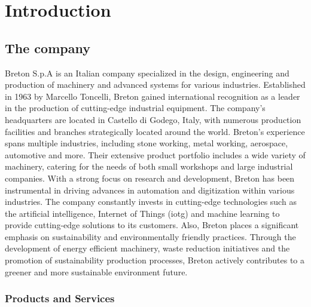 \chapter{Introduction}\label{cap:Introduction}
\section{The company}
Breton S.p.A is an Italian company specialized in the design, engineering and production of machinery and advanced systems for various industries. 
Established in 1963 by Marcello Toncelli, Breton gained international recognition as a leader in the production of cutting-edge industrial equipment. 
The company's headquarters are located in Castello di Godego, Italy, with numerous production facilities and branches strategically located around the world. 
Breton's experience spans multiple industries, including stone working, metal working, aerospace, automotive and more.
Their extensive product portfolio includes a wide variety of machinery, catering for the needs of both small workshops and large industrial companies.
With a strong focus on research and development, Breton has been instrumental in driving advances in automation and digitization within various industries.
The company constantly invests in cutting-edge technologies such as the artificial intelligence, Internet of Things (\gls{iotg}\glsfirstoccur) and machine learning to provide cutting-edge solutions to its customers. 
Also, Breton places a significant emphasis on sustainability and environmentally friendly practices. 
Through the development of energy efficient machinery, waste reduction initiatives and the promotion of sustainability production processes, Breton actively contributes to a greener and more sustainable environment future.
\subsection{Products and Services}
